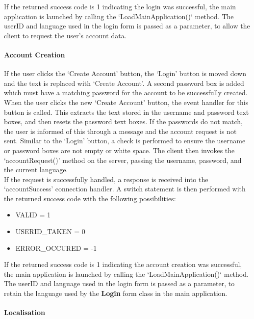 \documentclass{article}
\begin{document}
If the returned success code is 1 indicating the login was successful, the main application is launched by calling the `LoadMainApplication()` method. The userID and language used in the login form is passed as a parameter, to allow the client to request the user's account data.

\paragraph{Account Creation\\}

If the user clicks the `Create Account' button, the `Login' button is moved down and the text is replaced with `Create Account'. A second password box is added which must have a matching password for the account to be successfully created. \\

When the user clicks the new `Create Account' button, the event handler for this button is called. This extracts the text stored in the username and password text boxes, and then resets the password text boxes. If the passwords do not match, the user is informed of this through a message and the account request is not sent. Similar to the `Login' button, a check is performed to ensure the username or password boxes are not empty or white space. The client then invokes the `accountRequest()' method on the server, passing the username, password, and the current language. \\

If the request is successfully handled, a response is received into the `accountSuccess' connection handler. A switch statement is then performed with the returned success code with the following possibilities:

\begin{itemize}
    \item VALID = 1
    \item USERID\_TAKEN = 0
    \item ERROR\_OCCURED = -1
\end{itemize}

If the returned success code is 1 indicating the account creation was successful, the main application is launched by calling the `LoadMainApplication()` method. The userID and language used in the login form is passed as a parameter, to retain the language used by the \textbf{Login} form class in the main application.

\paragraph{Localisation\\}
\end{document}
